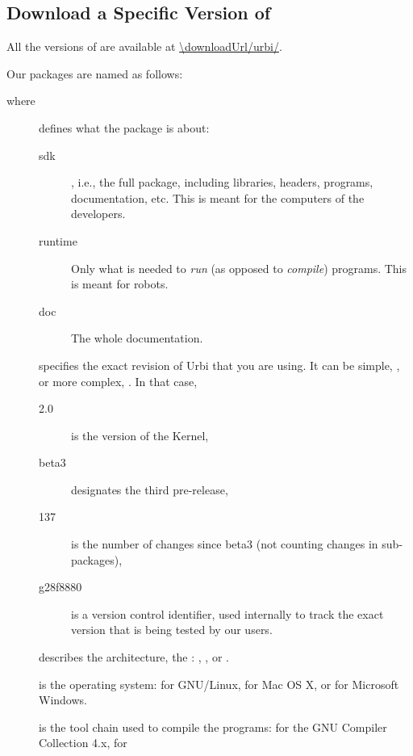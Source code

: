 \subsection{Download a Specific Version of \urbi}
\label{sec:dl:all}

All the versions of \urbi are available at \url{\downloadUrl/urbi/}.

Our packages are named as follows:
\begin{center}
\end{center}
where
\begin{description}
\item[] defines what the package is about:
  \begin{description}
  \item[sdk] \usdk, i.e., the full package, including libraries, headers,
    programs, documentation, etc.  This is meant for the computers of the
    developers.
  \item[runtime] Only what is needed to \emph{run} (as opposed to
    \emph{compile}) \urbi programs.  This is meant for robots.
  \item[doc] The whole documentation.
  \end{description}
\item[] specifies the exact revision of Urbi that you are
  using.  It can be simple, , or more complex,
  .  In that case,
  \begin{description}
  \item[2.0] is the version of the \urbi Kernel,
  \item[beta3] designates the third pre-release,
  \item[137] is the number of changes since beta3 (not counting
    changes in sub-packages),
  \item[g28f8880] is a version control identifier, used internally to
    track the exact version that is being tested by our users.
  \end{description}
\item[] describes the architecture, the :
  , , or .
\item[] is the operating system:  for GNU/Linux,
   for Mac OS X, or  for Microsoft Windows.
\item[] is the tool chain used to compile the programs:
   for the GNU Compiler Collection 4.x,  for

\end{description}
